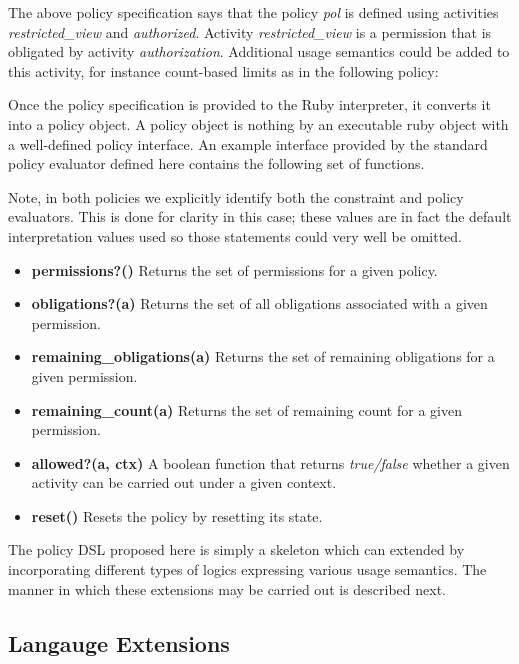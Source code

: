 

The above policy specification says that the policy {\em pol} is defined using activities {\em restricted\_view} and {\em authorized}.  Activity {\em restricted\_view} is a permission that is obligated by activity {\em authorization}.  Additional usage semantics could be added to this activity, for instance count-based limits as in the following policy:



Once the policy specification is provided to the Ruby interpreter, it converts it into a policy object. A policy object is nothing by an executable ruby object with a well-defined policy interface. An example interface provided by the standard policy evaluator defined here contains the following set of functions.

Note, in both policies we explicitly identify both the constraint and policy evaluators.  This is done for clarity in this case; these values are in fact the default interpretation values used so those statements could very well be omitted.

\begin{itemize}
\item {\bf permissions?()} Returns the set of permissions for a given policy.
\item {\bf obligations?(a)} Returns the set of all obligations associated with a given permission. 
\item {\bf remaining\_obligations(a)} Returns the set of remaining obligations for a given permission. 
\item {\bf remaining\_count(a)} Returns the set of remaining count for a given permission. 
\item {\bf allowed?(a, ctx)} A boolean function that returns {\em true/false} whether a given activity can be carried out under a given context. 
\item {\bf reset()} Resets the policy by resetting its state. 
\end{itemize}

The policy DSL proposed here is simply a skeleton which can extended by incorporating different types of logics expressing various usage semantics. The manner in which these extensions may be carried out is described next. 

\subsection{Langauge Extensions}

